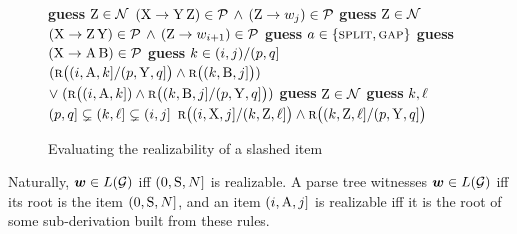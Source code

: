 \documentclass{article}
\begin{document}
\begin{figure}[H]
    \begin{algorithm}[H]        \algrenewcommand{}\footnotesize
    \algrenewcommand\algorithmicindent{1.0em}
        \caption{Evaluating the realizability of a slashed item}
        \label{alg2}
        \begin{algorithmic}[1]
            \Function{\recAlgo}{$(\idxi, \NT{X}, \idxj] / (p, \NT{Y}, q]$}
            \State \textbf{guess} ${{ \mathrm{Z}}} \in {{ \mathcal{N}}}$
            \State \Return $({{ \mathrm{X}}} \to {{ \mathrm{Y}}}\,{{ \mathrm{Z}}}) \in {{ \mathcal{P}}} \,\wedge\, ({{ \mathrm{Z}}} \to {w}_{{ j}}) \in {{ \mathcal{P}}}$
            \State \textbf{guess} ${{ \mathrm{Z}}} \in {{ \mathcal{N}}}$
            \State \Return $({{ \mathrm{X}}} \to {{ \mathrm{Z}}}\,{{ \mathrm{Y}}}) \in {{ \mathcal{P}}} \,\wedge\, ({{ \mathrm{Z}}} \to {w}_{{{ i}}+1}) \in {{ \mathcal{P}}}$
            \Else
            \State \textbf{guess} $a \in \{\textsc{split}, \textsc{gap}\}$
            \State \textbf{guess} $({{ \mathrm{X}}} \to {{ \mathrm{A}}}\,{{ \mathrm{B}}}) \in {{ \mathcal{P}}}$
            \State \textbf{guess} ${{ k}} \in ({{ i}}, {{ j}}) / (p,q]$
            \State \Return $({\textsc{r}}\bigl(({{ i}}, {{ \mathrm{A}}}, {{ k}}] / (p, {{ \mathrm{Y}}}, q]\bigr) \wedge {\textsc{r}}\bigl(({{ k}}, {{ \mathrm{B}}}, {{ j}}]\bigr))$
            \Statex \hspace*{2.85em} $\lor\; ({\textsc{r}}\bigl(({{ i}}, {{ \mathrm{A}}}, {{ k}}]) \wedge {\textsc{r}}\bigl(({{ k}}, {{ \mathrm{B}}}, {{ j}}]/ (p, {{ \mathrm{Y}}}, q]\bigr))$
            \Else
            \State \textbf{guess} ${{ \mathrm{Z}}} \in {{ \mathcal{N}}}$
            \State \textbf{guess} ${{ k}},{{\ell}}$ $(p,q]\subsetneq({{ k}},{{\ell}}]\subsetneq({{ i}},{{ j}}]$ 
            \State \Return ${\textsc{r}}\bigl(({{ i}}, {{ \mathrm{X}}}, {{ j}}] / ({{ k}}, {{ \mathrm{Z}}}, {{\ell}}]\bigr) \wedge {\textsc{r}}\bigl(({{ k}}, {{ \mathrm{Z}}}, {{\ell}}] / (p, {{ \mathrm{Y}}}, q]\bigr)$
            \EndIf
            \EndIf
            \EndFunction
        \end{algorithmic}
    \end{algorithm}
\end{figure}

Naturally, ${{\boldsymbol{w}}} \in {L}({{ \mathcal{G}}})$ iff $(0, {{ \mathrm{S}}}, {{ N}}]$ is realizable.
A parse tree witnesses ${{\boldsymbol{w}}} \in {L}({{ \mathcal{G}}})$ iff its root is the item $(0, {{ \mathrm{S}}}, {{ N}}]$, and an item $({{ i}}, {{ \mathrm{A}}}, {{ j}}]$ is realizable iff it is the root of some sub-derivation built from these rules.
\end{document}

